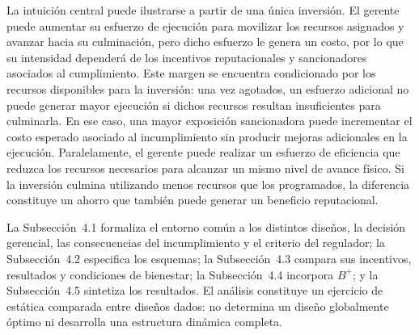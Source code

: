 La intuición central puede ilustrarse a partir de una única inversión. El gerente puede aumentar su esfuerzo de ejecución para movilizar los recursos asignados y avanzar hacia su culminación, pero dicho esfuerzo le genera un costo, por lo que su intensidad dependerá de los incentivos reputacionales y sancionadores asociados al cumplimiento. Este margen se encuentra condicionado por los recursos disponibles para la inversión: una vez agotados, un esfuerzo adicional no puede generar mayor ejecución si dichos recursos resultan insuficientes para culminarla. En ese caso, una mayor exposición sancionadora puede incrementar el costo esperado asociado al incumplimiento sin producir mejoras adicionales en la ejecución. Paralelamente, el gerente puede realizar un esfuerzo de eficiencia que reduzca los recursos necesarios para alcanzar un mismo nivel de avance físico. Si la inversión culmina utilizando menos recursos que los programados, la diferencia constituye un ahorro que también puede generar un beneficio reputacional.

La Subsección~4.1 formaliza el entorno común a los distintos diseños, la decisión gerencial, las consecuencias del incumplimiento y el criterio del regulador; la Subsección~4.2 especifica los esquemas; la Subsección~4.3 compara sus incentivos, resultados y condiciones de bienestar; la Subsección~4.4 incorpora \(B^{+}\); y la Subsección~4.5 sintetiza los resultados. El análisis constituye un ejercicio de estática comparada entre diseños dados: no determina un diseño globalmente óptimo ni desarrolla una estructura dinámica completa.









